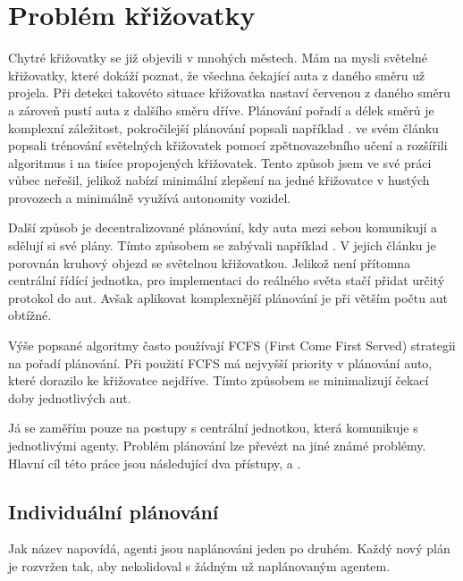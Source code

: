 \section{Problém křižovatky}\label{sec:problem}

Chytré křižovatky se již objevili v mnohých městech.
Mám na mysli světelné křižovatky, které dokáží poznat, že všechna čekající auta z daného směru už projela.
Při detekci takovéto situace křižovatka nastaví červenou z daného směru a zároveň pustí auta z dalšího směru dříve.
Plánování pořadí a délek směrů je komplexní záležitost, pokročilejší plánování popsali například \citet*{Goldstein}.
\citet*{Liang} ve svém článku popsali trénování světelných křižovatek pomocí zpětnovazebního učení a rozšířili algoritmus i na tisíce propojených křižovatek.
Tento způsob jsem ve své práci vůbec neřešil, jelikož nabízí minimální zlepšení na jedné křižovatce v hustých provozech a minimálně využívá autonomity vozidel.

Další způsob je decentralizované plánování, kdy auta mezi sebou komunikují a sdělují si své plány.
Tímto způsobem se zabývali například \citet*{Wu}.
V jejich článku je porovnán kruhový objezd se světelnou křižovatkou.
Jelikož není přítomna centrální řídící jednotka, pro implementaci do reálného světa stačí přidat určitý protokol do aut.
Avšak aplikovat komplexnější plánování je při větším počtu aut obtížné.

Výše popsané algoritmy často používají FCFS (First Come First Served) strategii na pořadí plánování.
Při použití FCFS má nejvyšší priority v plánování auto, které dorazilo ke křižovatce nejdříve.
Tímto způsobem se minimalizují čekací doby jednotlivých aut.

Já se zaměřím pouze na postupy s centrální jednotkou, která komunikuje s jednotlivými agenty.
Problém plánování lze převézt na jiné známé problémy.
Hlavní cíl této práce jsou následující dva přístupy,  a .

\subsection{Individuální plánování}\label{subsec:individualni_planovani}

Jak název napovídá, agenti jsou naplánováni jeden po druhém.
Každý nový plán je rozvržen tak, aby nekolidoval s žádným už naplánovaným agentem.

